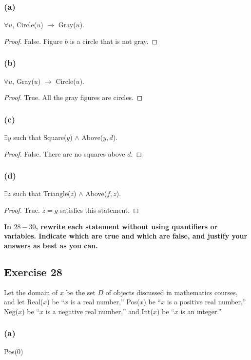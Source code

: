 \documentclass[14pt]{extarticle}
\newcommand{\fa}{\forall}
\newcommand{\te}{\exists}
\begin{document}
\subsubsection{(a)}
$\fa u$, Circle($u$) $\to$ Gray($u$).

\begin{proof}
    False. Figure $b$ is a circle that is not gray.
\end{proof}

\subsubsection{(b)}
$\fa u$, Gray($u$) $\to$ Circle($u$).

\begin{proof}
    True. All the gray figures are circles.
\end{proof}

\subsubsection{(c)}
$\te y$ such that Square($y$) $\wedge$ Above($y, d$).

\begin{proof}
    False. There are no squares above $d$.
\end{proof}

\subsubsection{(d)}
$\te z$ such that Triangle($z$) $\wedge$ Above($f, z$).

\begin{proof}
    True. $z = g$ satisfies this statement.
\end{proof}

{\bf \color{cyan} In $28-30$, rewrite each statement without using quantifiers or variables. Indicate which are true and which are false, and justify your answers as best as you can.}

\subsection{Exercise 28}
Let the domain of $x$ be the set $D$ of objects discussed in mathematics courses, and let Real($x$) be “$x$ is a real number,” Pos($x$) be “$x$ is a positive real number,” Neg($x$) be “$x$ is a negative real number,” and Int($x$) be “$x$ is an integer.”

\subsubsection{(a)}
Pos(0)
\end{document}
